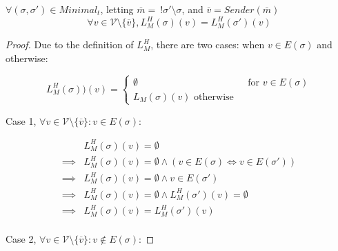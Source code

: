 \begin{lemma}
$\forall (\sigma, \sigma') \in Minimal_t$, letting $\overline{m} =~!\sigma'\setminus\sigma$, and $\overline{v} = Sender(\overline{m})$
$$
\forall v \in \mathcal{V} \setminus \{\overline{v}\}, L^H_M(\sigma)(v) = L^H_M(\sigma')(v)
$$
\end{lemma}

\begin{proof}
Due to the definition of $L^H_M$, there are two cases: when $v \in E(\sigma)$ and otherwise:

\[ L^H_M(\sigma))(v) = \left\{
\begin{array}{ll}
      \emptyset& \text{ for } v \in E(\sigma) \\
      L_M(\sigma)(v) \text{ otherwise }
\end{array}
\right.\]

Case 1, $\forall v \in \mathcal{V} \setminus \{\overline{v}\} : v \in E(\sigma)$:

\begin{align}
&L^H_M(\sigma)(v) = \emptyset \\
\implies&L^H_M(\sigma)(v) = \emptyset \land (v \in E(\sigma) \iff v \in E(\sigma')) \\
\implies&L^H_M(\sigma)(v) = \emptyset \land v \in E(\sigma') \\
\implies&L^H_M(\sigma)(v) = \emptyset \land L^H_M(\sigma')(v) = \emptyset \\
\implies&L^H_M(\sigma)(v) = L^H_M(\sigma')(v) \\
\end{align}

Case 2, $\forall v \in \mathcal{V} \setminus \{\overline{v}\} : v \notin E(\sigma)$:


\end{proof}
